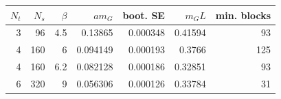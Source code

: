 \begin{tabular}{rrrrrrr}
\toprule
$N_t$ & $N_s$ & $\beta$ & $am_G$ & boot. SE & $m_G L$ & min. blocks\\\midrule
3 & 96 & 4.5 & 0.13865 & 0.000348 & 0.41594 & 93\\
4 & 160 & 6 & 0.094149 & 0.000193 & 0.3766 & 125\\
4 & 160 & 6.2 & 0.082128 & 0.000186 & 0.32851 & 93\\
6 & 320 & 9 & 0.056306 & 0.000126 & 0.33784 & 31\\
\bottomrule
\end{tabular}

